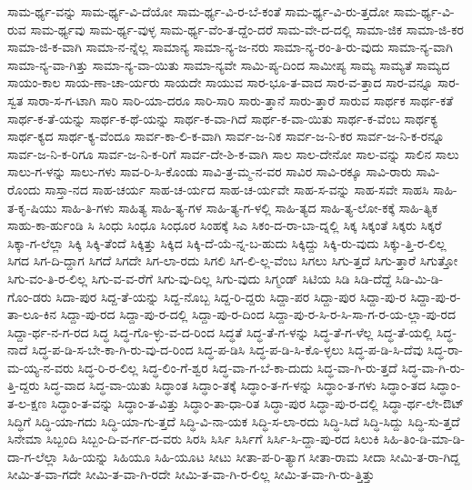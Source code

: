 {ಸಾಮ-ರ್ಥ್ಯ-ವನ್ನು
ಸಾಮ-ರ್ಥ್ಯ-ವಿ-ದೆಯೋ
ಸಾಮ-ರ್ಥ್ಯ-ವಿ-ರ-ಬೆ-ಕಂತೆ
ಸಾಮ-ರ್ಥ್ಯ-ವಿ-ರು-ತ್ತದೋ
ಸಾಮ-ರ್ಥ್ಯ-ವಿ-ರುವ
ಸಾಮ-ರ್ಥ್ಯವು
ಸಾಮ-ರ್ಥ್ಯ-ವುಳ್ಳ
ಸಾಮ-ರ್ಥ್ಯ-ವೆಂ-ತ-ದ್ದೆಂ-ದರೆ
ಸಾಮ-ವೇ-ದ-ದಲ್ಲಿ
ಸಾಮಾ-ಜಿಕ
ಸಾಮಾ-ಜಿ-ಕರ
ಸಾಮಾ-ಜಿ-ಕ-ವಾಗಿ
ಸಾಮಾ-ನ-ನ್ನೆಲ್ಲ
ಸಾಮಾನ್ಯ
ಸಾಮಾ-ನ್ಯ-ಜ-ನರು
ಸಾಮಾ-ನ್ಯ-ರಂ-ತಿ-ರು-ವುದು
ಸಾಮಾ-ನ್ಯ-ವಾಗಿ
ಸಾಮಾ-ನ್ಯ-ವಾ-ಗಿತ್ತು
ಸಾಮಾ-ನ್ಯ-ವಾ-ಯಿತು
ಸಾಮಾ-ನ್ಯವೇ
ಸಾಮಿ-ಪ್ಯ-ದಿಂದ
ಸಾಮೀಪ್ಯ
ಸಾಮ್ಯ
ಸಾಮ್ಯತೆ
ಸಾಮ್ಯದ
ಸಾಯಂ-ಕಾಲ
ಸಾಯ-ಣಾ-ಚಾ-ರ್ಯರು
ಸಾಯದೇ
ಸಾಯುವ
ಸಾರ-ಭೂ-ತ-ವಾದ
ಸಾರ-ವ-ತ್ತಾದ
ಸಾರ-ವನ್ನೂ
ಸಾರ-ಸ್ವತ
ಸಾರಾ-ಸ-ಗ-ಟಾಗಿ
ಸಾರಿ
ಸಾರಿ-ಯಾ-ದರೂ
ಸಾರಿ-ಸಾರಿ
ಸಾರು-ತ್ತಾನೆ
ಸಾರು-ತ್ತಾರೆ
ಸಾರುವ
ಸಾರ್ಥಕ
ಸಾರ್ಥ-ಕತೆ
ಸಾರ್ಥ-ಕ-ತೆ-ಯನ್ನು
ಸಾರ್ಥ-ಕ-ಥೆ-ಯನ್ನು
ಸಾರ್ಥ-ಕ-ವಾ-ಗಿದೆ
ಸಾರ್ಥ-ಕ-ವಾ-ಯಿತು
ಸಾರ್ಥ-ಕ-ವೆಂಬ
ಸಾರ್ಥಕ್ಯ
ಸಾರ್ಥ-ಕ್ಯದ
ಸಾರ್ಥ-ಕ್ಯ-ವೆಂದೂ
ಸಾರ್ವ-ಕಾ-ಲಿ-ಕ-ವಾಗಿ
ಸಾರ್ವ-ಜ-ನಿಕ
ಸಾರ್ವ-ಜ-ನಿ-ಕರ
ಸಾರ್ವ-ಜ-ನಿ-ಕ-ರನ್ನೂ
ಸಾರ್ವ-ಜ-ನಿ-ಕ-ರಿಗೂ
ಸಾರ್ವ-ಜ-ನಿ-ಕ-ರಿಗೆ
ಸಾರ್ವ-ದೇ-ಶಿ-ಕ-ವಾಗಿ
ಸಾಲ
ಸಾಲ-ದೇನೋ
ಸಾಲ-ವನ್ನು
ಸಾಲಿನ
ಸಾಲು
ಸಾಲು-ಗ-ಳನ್ನು
ಸಾಲು-ಗಳು
ಸಾವ-ರಿ-ಸಿ-ಕೊಂಡು
ಸಾವಿ-ತ್ರ-ಮ್ಮ-ನ-ವರ
ಸಾವಿರ
ಸಾವಿ-ರಕ್ಕೂ
ಸಾವಿ-ರಾರು
ಸಾವಿ-ರೊಂದು
ಸಾಸ್ತಾ-ನದ
ಸಾಹ-ಚರ್ಯ
ಸಾಹ-ಚ-ರ್ಯದ
ಸಾಹ-ಚ-ರ್ಯವೇ
ಸಾಹ-ಸ-ವನ್ನು
ಸಾಹ-ಸವೇ
ಸಾಹಸಿ
ಸಾಹಿ-ತ-ಕೃ-ಷಿಯು
ಸಾಹಿ-ತಿ-ಗಳು
ಸಾಹಿತ್ಯ
ಸಾಹಿ-ತ್ಯ-ಗಳ
ಸಾಹಿ-ತ್ಯ-ಗ-ಳಲ್ಲಿ
ಸಾಹಿ-ತ್ಯದ
ಸಾಹಿ-ತ್ಯ-ಲೋ-ಕಕ್ಕೆ
ಸಾಹಿ-ತ್ಯಿಕ
ಸಾಹು-ಕಾ-ರ್ಹುಂಡಿ
ಸಿ
ಸಿಂಧು
ಸಿಂಧೂ
ಸಿಂಧೂರ
ಸಿಂಹಕ್ಕೆ
ಸಿಎ
ಸಿಕಂ-ದ-ರಾ-ಬಾ-ದ್ನಲ್ಲಿ
ಸಿಕ್ಕ
ಸಿಕ್ಕಂತೆ
ಸಿಕ್ಕರು
ಸಿಕ್ಕರೆ
ಸಿಕ್ಕಾ-ಗ-ಲೆಲ್ಲಾ
ಸಿಕ್ಕಿ
ಸಿಕ್ಕಿ-ತೆಂದೆ
ಸಿಕ್ಕಿತ್ತು
ಸಿಕ್ಕಿದ
ಸಿಕ್ಕಿ-ದೆ-ಯೆ-ನ್ನ-ಬ-ಹುದು
ಸಿಕ್ಕಿದ್ದು
ಸಿಕ್ಕಿ-ರು-ವುದು
ಸಿಕ್ಕು-ತ್ತಿ-ರ-ಲಿಲ್ಲ
ಸಿಗದ
ಸಿಗ-ದಿ-ದ್ದಾಗ
ಸಿಗದೆ
ಸಿಗದೇ
ಸಿಗ-ಲಾ-ರದು
ಸಿಗಲಿ
ಸಿಗ-ಲಿ-ಲ್ಲ-ವೆಂಬ
ಸಿಗಲು
ಸಿಗು-ತ್ತದೆ
ಸಿಗು-ತ್ತಾರೆ
ಸಿಗುತ್ತೋ
ಸಿಗು-ವಂ-ತಿ-ರ-ಲಿಲ್ಲ
ಸಿಗು-ವ-ವ-ರೆಗೆ
ಸಿಗು-ವು-ದಿಲ್ಲ
ಸಿಗು-ವುದು
ಸಿಗ್ಮಂಡ್
ಸಿಟಿಯ
ಸಿಡಿ
ಸಿಡಿ-ದೆದ್ದೆ
ಸಿಡಿ-ಮಿ-ಡಿ-ಗೊಂ-ಡರು
ಸಿದಾ-ಪುರ
ಸಿದ್ದ-ತೆ-ಯನ್ನು
ಸಿದ್ದ-ನೊಬ್ಬ
ಸಿದ್ದ-ರಿ-ದ್ದರು
ಸಿದ್ದಾ-ಪರ
ಸಿದ್ದಾ-ಪುರ
ಸಿದ್ದಾ-ಪು-ರ	
ಸಿದ್ದಾ-ಪು-ರ-ತಾ-ಲೂ-ಕಿನ
ಸಿದ್ದಾ-ಪು-ರದ
ಸಿದ್ದಾ-ಪು-ರ-ದಲ್ಲಿ
ಸಿದ್ದಾ-ಪು-ರ-ದಿಂದ
ಸಿದ್ದಾ-ಪು-ರ-ಸಿ-ರ-ಸಿ-ಸಾ-ಗ-ರ-ಯ-ಲ್ಲಾ-ಪು-ರದ
ಸಿದ್ದಾ-ರ್ಥ-ನ-ಗ-ರದ
ಸಿದ್ಧ
ಸಿದ್ಧ-ಗೊ-ಳ್ಳು-ವ-ದ-ರಿಂದ
ಸಿದ್ಧತೆ
ಸಿದ್ಧ-ತೆ-ಗ-ಳನ್ನು
ಸಿದ್ಧ-ತೆ-ಗ-ಳೆಲ್ಲ
ಸಿದ್ಧ-ತೆ-ಯಲ್ಲಿ
ಸಿದ್ಧ-ನಾದೆ
ಸಿದ್ಧ-ಪ-ಡಿ-ಸ-ಬೇ-ಕಾ-ಗಿ-ರು-ವು-ದ-ರಿಂದ
ಸಿದ್ಧ-ಪ-ಡಿಸಿ
ಸಿದ್ಧ-ಪ-ಡಿ-ಸಿ-ಕೊ-ಳ್ಳಲು
ಸಿದ್ಧ-ಪ-ಡಿ-ಸಿ-ದೆವು
ಸಿದ್ಧ-ರಾ-ಮ-ಯ್ಯ-ನ-ವರು
ಸಿದ್ಧ-ರಿ-ರ-ಲಿಲ್ಲ
ಸಿದ್ಧ-ಲಿಂ-ಗೆ-ಶ್ವರ
ಸಿದ್ಧ-ವಾ-ಗ-ಬೆ-ಕಾ-ದುದು
ಸಿದ್ಧ-ವಾ-ಗಿ-ರು-ತ್ತದೆ
ಸಿದ್ಧ-ವಾ-ಗಿ-ರು-ತ್ತಿ-ದ್ದರು
ಸಿದ್ಧ-ವಾದ
ಸಿದ್ಧ-ವಾ-ಯಿತು
ಸಿದ್ಧಾಂತ
ಸಿದ್ಧಾಂ-ತಕ್ಕೆ
ಸಿದ್ಧಾಂ-ತ-ಗ-ಳನ್ನು
ಸಿದ್ಧಾಂ-ತ-ಗಳು
ಸಿದ್ಧಾಂ-ತದ
ಸಿದ್ಧಾಂ-ತ-ಲ-ಕ್ಷಣ
ಸಿದ್ಧಾಂ-ತ-ವನ್ನು
ಸಿದ್ಧಾಂ-ತ-ವಿತ್ತು
ಸಿದ್ಧಾಂ-ತಾ-ಧಾ-ರಿತ
ಸಿದ್ಧಾ-ಪುರ
ಸಿದ್ಧಾ-ಪು-ರ-ದಲ್ಲಿ
ಸಿದ್ಧಾ-ರ್ಥ-ಲೇ-ಔಟ್
ಸಿದ್ಧಿಗೆ
ಸಿದ್ಧಿ-ಯಾ-ಗದು
ಸಿದ್ಧಿ-ಯಾ-ಗು-ತ್ತದೆ
ಸಿದ್ಧಿ-ವಿ-ನಾ-ಯಕ
ಸಿದ್ಧಿ-ಸ-ಲಾ-ರದು
ಸಿದ್ಧಿ-ಸಿದೆ
ಸಿದ್ಧಿ-ಸಿದ್ದು
ಸಿದ್ಧಿ-ಸು-ತ್ತದೆ
ಸಿನೇಮಾ
ಸಿಬ್ಬಂದಿ
ಸಿಬ್ಬಂ-ದಿ-ವ-ರ್ಗ-ದ-ವರು
ಸಿರಸಿ
ಸಿರ್ಸಿ
ಸಿರ್ಸಿಗೆ
ಸಿರ್ಸಿ-ಸಿ-ದ್ದಾ-ಪು-ರದ
ಸಿಲುಕಿ
ಸಿಹಿ-ತಿಂ-ಡಿ-ಮಾ-ಡಿ-ದಾ-ಗ-ಲೆಲ್ಲಾ
ಸಿಹಿ-ಯನ್ನು
ಸಿಹಿಯೂ
ಸಿಹಿ-ಯೂಟ
ಸೀಟು
ಸೀತಾ-ಪ-ರಿ-ತ್ಯಾಗ
ಸೀತಾ-ರಾಮ
ಸೀದಾ
ಸೀಮಿ-ತ-ರಾ-ಗಿದ್ದ
ಸೀಮಿ-ತ-ವಾ-ಗದೇ
ಸೀಮಿ-ತ-ವಾ-ಗಿ-ರದೇ
ಸೀಮಿ-ತ-ವಾ-ಗಿ-ರ-ಲಿಲ್ಲ
ಸೀಮಿ-ತ-ವಾ-ಗಿ-ರು-ತ್ತಿತ್ತು
}
